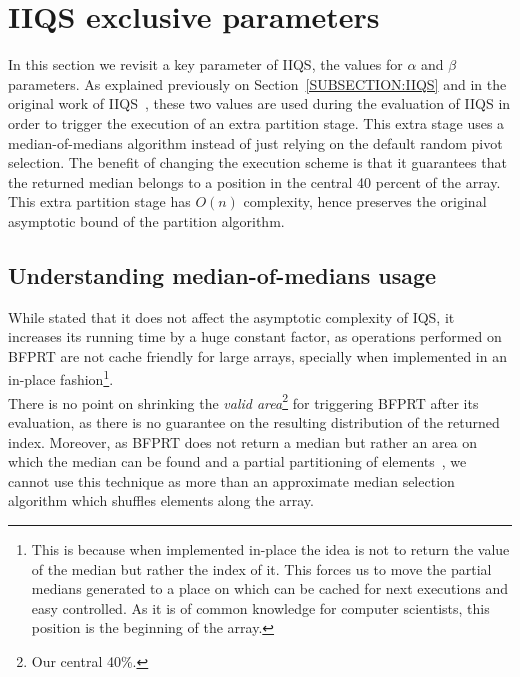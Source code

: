 \section{IIQS exclusive parameters}
\label{SECTION:IQS_PARAMS}

In this section we revisit a key parameter of IIQS, the values for $\alpha$ and $\beta$ parameters. As explained previously on Section~\ref{SUBSECTION:IIQS} and in the original work of IIQS~\cite{7416566}, these two values are used during the evaluation of IIQS in order to trigger the execution of an extra partition stage. This extra stage uses a median-of-medians algorithm instead of just relying on the default random pivot selection. The benefit of changing the execution scheme is that it guarantees that the returned median belongs to a position in the central 40 percent of the array.  This extra partition stage has $O(n)$ complexity, hence preserves the original asymptotic bound of the partition algorithm.\\

\subsection{Understanding median-of-medians usage}

While stated that it does not affect the asymptotic complexity of IQS, it increases its running time by a huge constant factor, as operations performed on BFPRT are not cache friendly for large arrays, specially when implemented in an in-place fashion\footnote{This is because when implemented in-place the idea is not to return the value of the median but rather the index of it. This forces us to move the partial medians generated to a place on which can be cached for next executions and easy controlled. As it is of common knowledge for computer scientists, this position is the beginning of the array.}. \\

There is no point on shrinking the \emph{valid area}\footnote{Our central 40\%.} for triggering BFPRT after its evaluation, as there is no guarantee on the resulting distribution of the returned index. Moreover, as BFPRT does not return a median but rather an area on which the median can be found and a partial partitioning of elements~\cite{Blum_Floyd_Pratt_Rivest_Tarjan_1973}, we cannot use this technique as more than an approximate median selection algorithm which shuffles elements along the array.\\

